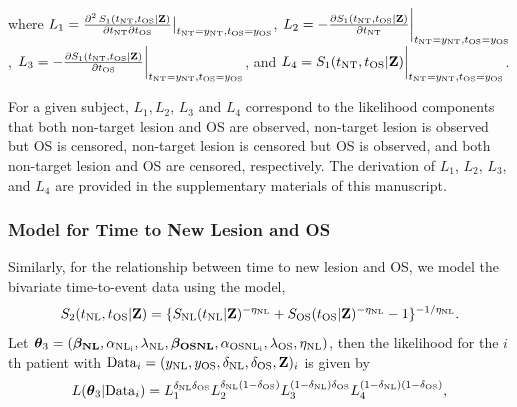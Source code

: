 where
$L_1=\frac{\partial^2\, S_1(t_{\rm NT}, t_{\rm OS}|\textbf{Z})}{\partial t_{\rm NT} \partial t_{\rm OS}}\big|_{t_{\rm NT}=y_{\rm NT},t_{\rm OS}=y_{\rm OS}}$, $L_2=-\frac{\partial S_1(t_{\rm NT}, t_{\rm OS}|\textbf{Z})}{\partial t_{\rm NT}}\bigg|_{t_{\rm NT}=y_{\rm NT},t_{\rm OS}=y_{\rm OS}}$, $L_3=-\frac{\partial S_1(t_{\rm NT}, t_{\rm OS}|\textbf{Z})}{\partial t_{\rm OS}}\bigg|_{t_{\rm NT}=y_{\rm NT},t_{\rm OS}=y_{\rm OS}}$, and $L_4=S_1(t_{\rm NT}, t_{\rm OS}|\textbf{Z})\bigg|_{t_{\rm NT}=y_{\rm NT},t_{\rm OS}=y_{\rm OS}}$.


For a given subject, $L_1, L_2$,  $L_3$ and $L_4$ correspond to the likelihood components that both non-target lesion and \ac{OS} are observed, non-target lesion is observed but \ac{OS} is censored, non-target lesion is censored but \ac{OS} is observed, and both non-target lesion and \ac{OS} are censored, respectively. The derivation of $L_1$, $L_2$, $L_3$, and $L_4$ are provided in the supplementary materials of this manuscript. 





\subsubsection{Model for Time to New Lesion and OS}
Similarly, for the relationship between time to new lesion and \ac{OS}, we model
the bivariate time-to-event data using the \cite{clayton1978model} model,
\begin{equation}
S_2(t_{\rm NL},
t_{\rm OS}|\textbf{Z})=\{S_{\rm NL}(t_{\rm NL}|\textbf{Z})^{-\eta_{\rm NL}}
+S_{\rm OS}(t_{\rm OS}|\textbf{Z})^{-\eta_{\rm NL}}-1\}^{-1/\eta_{\rm NL}}. \label{clayton2}
\end{equation}
Let
$\boldsymbol{\theta}_3=(\boldsymbol{\beta_{\rm NL}}, \alpha_{\rm NL_i}, \lambda_{\rm NL}, \boldsymbol{\beta_{\rm OSNL}},
\alpha_{\rm OSNL_i}, \lambda_{\rm OS}, \eta_{\rm NL})$,  then the likelihood for the $i$th patient with ${\rm Data}_i=(y_{\rm NL}, y_{\rm OS},
\delta_{\rm NL}, \delta_{\rm OS}, \textbf{Z})_i$ is given by
$$
L(\boldsymbol{\theta}_3|{\rm Data}_i)
=L_1^{\delta_{\rm NL}\delta_{\rm OS}}
L_2^{\delta_{\rm NL}(1-\delta_{\rm OS})}L_3^{(1-\delta_{\rm NL})\delta_{\rm OS}}
L_4^{(1-\delta_{\rm NL})(1-\delta_{\rm OS})}, \label{likelihood2}
$$

